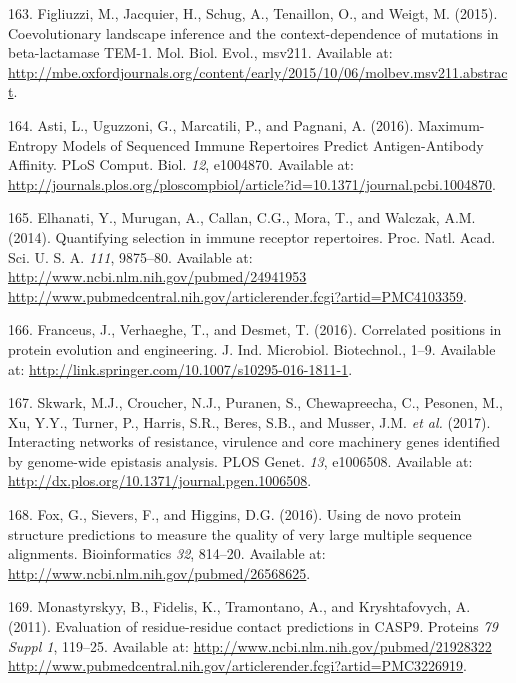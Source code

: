 \documentclass[11pt,a4paper,twoside]{book}
\theoremstyle{definition}
\theoremstyle{definition}
\theoremstyle{remark}
\begin{document}
\hypertarget{ref-Figliuzzi2015}{}
163. Figliuzzi, M., Jacquier, H., Schug, A., Tenaillon, O., and Weigt,
M. (2015). Coevolutionary landscape inference and the context-dependence
of mutations in beta-lactamase TEM-1. Mol. Biol. Evol., msv211.
Available at:
\url{http://mbe.oxfordjournals.org/content/early/2015/10/06/molbev.msv211.abstract}.

\hypertarget{ref-Asti2016}{}
164. Asti, L., Uguzzoni, G., Marcatili, P., and Pagnani, A. (2016).
Maximum-Entropy Models of Sequenced Immune Repertoires Predict
Antigen-Antibody Affinity. PLoS Comput. Biol. \emph{12}, e1004870.
Available at:
\url{http://journals.plos.org/ploscompbiol/article?id=10.1371/journal.pcbi.1004870}.

\hypertarget{ref-Elhanati2014}{}
165. Elhanati, Y., Murugan, A., Callan, C.G., Mora, T., and Walczak,
A.M. (2014). Quantifying selection in immune receptor repertoires. Proc.
Natl. Acad. Sci. U. S. A. \emph{111}, 9875--80. Available at:
\href{http://www.ncbi.nlm.nih.gov/pubmed/24941953\%20http://www.pubmedcentral.nih.gov/articlerender.fcgi?artid=PMC4103359}{http://www.ncbi.nlm.nih.gov/pubmed/24941953 http://www.pubmedcentral.nih.gov/articlerender.fcgi?artid=PMC4103359}.

\hypertarget{ref-Franceus2016}{}
166. Franceus, J., Verhaeghe, T., and Desmet, T. (2016). Correlated
positions in protein evolution and engineering. J. Ind. Microbiol.
Biotechnol., 1--9. Available at:
\url{http://link.springer.com/10.1007/s10295-016-1811-1}.

\hypertarget{ref-Skwark2017}{}
167. Skwark, M.J., Croucher, N.J., Puranen, S., Chewapreecha, C.,
Pesonen, M., Xu, Y.Y., Turner, P., Harris, S.R., Beres, S.B., and
Musser, J.M. \emph{et al.} (2017). Interacting networks of resistance,
virulence and core machinery genes identified by genome-wide epistasis
analysis. PLOS Genet. \emph{13}, e1006508. Available at:
\url{http://dx.plos.org/10.1371/journal.pgen.1006508}.

\hypertarget{ref-Fox2016}{}
168. Fox, G., Sievers, F., and Higgins, D.G. (2016). Using de novo
protein structure predictions to measure the quality of very large
multiple sequence alignments. Bioinformatics \emph{32}, 814--20.
Available at: \url{http://www.ncbi.nlm.nih.gov/pubmed/26568625}.

\hypertarget{ref-Monastyrskyy2011}{}
169. Monastyrskyy, B., Fidelis, K., Tramontano, A., and Kryshtafovych,
A. (2011). Evaluation of residue-residue contact predictions in CASP9.
Proteins \emph{79 Suppl 1}, 119--25. Available at:
\href{http://www.ncbi.nlm.nih.gov/pubmed/21928322\%20http://www.pubmedcentral.nih.gov/articlerender.fcgi?artid=PMC3226919}{http://www.ncbi.nlm.nih.gov/pubmed/21928322 http://www.pubmedcentral.nih.gov/articlerender.fcgi?artid=PMC3226919}.
\end{document}
